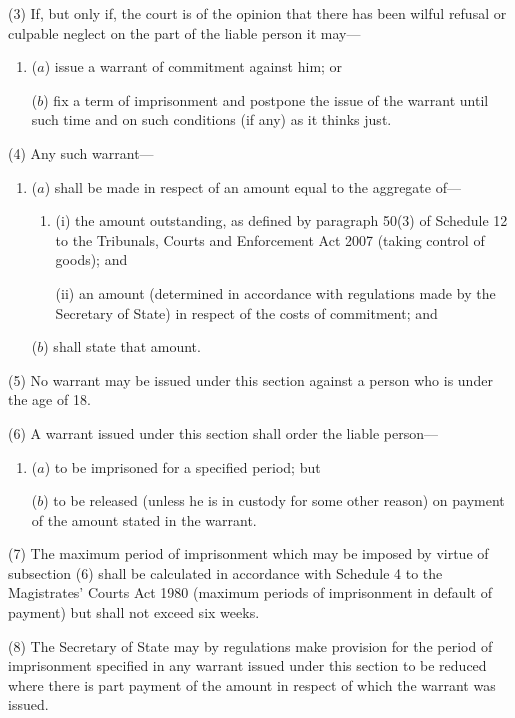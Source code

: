 \documentclass[12pt,a4paper]{article}
\begin{document}
(3) If, but only if, the court is of the opinion that there has been wilful refusal or culpable neglect on the part of the liable person it may—
\begin{enumerate}\item[]
($a$) issue a warrant of commitment against him; or

($b$) fix a term of imprisonment and postpone the issue of the warrant until such time and on such conditions (if any) as it thinks just.
\end{enumerate}

(4) Any such warrant—
\begin{enumerate}\item[]
($a$) shall be made in respect of an amount equal to the aggregate of—
\begin{enumerate}\item[]

(i) the amount outstanding, as defined by paragraph 50(3) of Schedule 12 to the Tribunals, Courts and Enforcement Act 2007 (taking control of goods); and

(ii) an amount (determined in accordance with regulations made by the Secretary of State) in respect of the costs of commitment; and
\end{enumerate}

($b$) shall state that amount.
\end{enumerate}

(5) No warrant may be issued under this section against a person who is under the age of 18.

(6) A warrant issued under this section shall order the liable person—
\begin{enumerate}\item[]
($a$) to be imprisoned for a specified period; but

($b$) to be released (unless he is in custody for some other reason) on payment of the amount stated in the warrant.
\end{enumerate}

(7) The maximum period of imprisonment which may be imposed by virtue of subsection (6)  shall be calculated in accordance with Schedule 4 to the Magistrates' Courts Act 1980 (maximum periods of imprisonment in default of payment) but shall not exceed six weeks.

(8) The Secretary of State may by regulations make provision for the period of imprisonment specified in any warrant issued under this section to be reduced where there is part payment of the amount in respect of which the warrant was issued.
\end{document}
